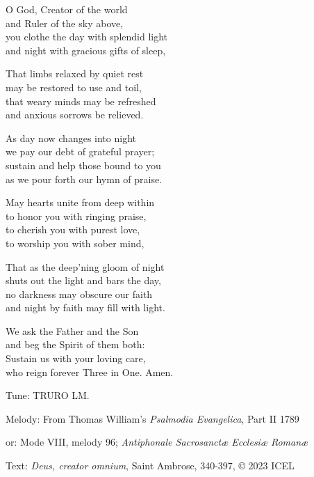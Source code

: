 \hymn

\begin{hymnverse}
O God, Creator of the world\\
and Ruler of the sky above,\\
you clothe the day with splendid light\\
and night with gracious gifts of sleep,

That limbs relaxed by quiet rest\\
may be restored to use and toil,\\
that weary minds may be refreshed\\
and anxious sorrows be relieved.

As day now changes into night\\
we pay our debt of grateful prayer;\\
sustain and help those bound to you\\
as we pour forth our hymn of praise.

May hearts unite from deep within\\
to honor you with ringing praise,\\
to cherish you with purest love,\\
to worship you with sober mind,

That as the deep’ning gloom of night\\
shuts out the light and bars the day,\\
no darkness may obscure our faith\\
and night by faith may fill with light.

We ask the Father and the Son\\
and beg the Spirit of them both:\\
Sustain us with your loving care,\\
who reign forever Three in One. Amen.
\end{hymnverse}

\begin{hymnsource}
Tune: TRURO LM.

Melody: From Thomas William’s \emph{Psalmodia Evangelica}, Part II 1789

or: Mode VIII, melody 96; \emph{Antiphonale Sacrosanctæ Ecclesiæ Romanæ}

Text: \emph{Deus, creator omnium}, Saint Ambrose, 340-397, © 2023 ICEL
\end{hymnsource}